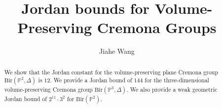 \documentclass[a4paper,12pt,oneside]{amsart}
\numberwithin{equation}{section}
\theoremstyle{definition}
\theoremstyle{remark}
\newcommand{\Ptwo}{\mathbb{P}^2}
\newcommand{\Bir}{\mathrm{Bir}}
\begin{document}
\pagestyle{plain}

\title{Jordan bounds for Volume-Preserving Cremona Groups}

\author[J. Wang]{Jiahe Wang}
\address{UCLA Mathematics Department, Box 951555, Los Angeles, CA 90095-1555, USA
}



\begin{abstract}
 We show that the Jordan constant for the volume-preserving plane Cremona group $\mathrm{Bir}(\Ptwo, \Delta)$ is $12$. We provide a Jordan bound of $144$ for the three-dimensional volume-preserving Cremona group $\mathrm{Bir}(\mathbb P^3,\Delta)$. We also provide a weak geometric Jordan bound of $2^{11} \cdot 3^2$ for $\Bir(\Ptwo)$. \end{abstract}

\maketitle
\tableofcontents
\end{document}
